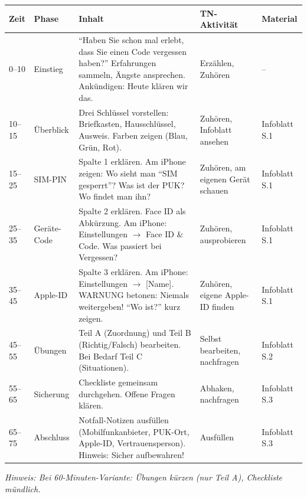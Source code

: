 \documentclass[11pt,a4paper]{article}
\begin{document}
\begin{longtable}{|p{1cm}|p{1.8cm}|p{4.5cm}|p{3.5cm}|p{2cm}|}
\hline
\textbf{Zeit} & \textbf{Phase} & \textbf{Inhalt} & \textbf{TN-Aktivität} & \textbf{Material} \\
\hline
\endhead

0--10 & Einstieg & ``Haben Sie schon mal erlebt, dass Sie einen Code vergessen haben?'' Erfahrungen sammeln, Ängste ansprechen. Ankündigen: Heute klären wir das. & Erzählen, Zuhören & -- \\
\hline

10--15 & Überblick & Drei Schlüssel vorstellen: Briefkasten, Hausschlüssel, Ausweis. Farben zeigen (Blau, Grün, Rot). & Zuhören, Infoblatt ansehen & Infoblatt S.1 \\
\hline

15--25 & SIM-PIN & Spalte 1 erklären. Am iPhone zeigen: Wo sieht man ``SIM gesperrt''? Was ist der PUK? Wo findet man ihn? & Zuhören, am eigenen Gerät schauen & Infoblatt S.1 \\
\hline

25--35 & Geräte-Code & Spalte 2 erklären. Face ID als Abkürzung. Am iPhone: Einstellungen $\rightarrow$ Face ID \& Code. Was passiert bei Vergessen? & Zuhören, ausprobieren & Infoblatt S.1 \\
\hline

35--45 & Apple-ID & Spalte 3 erklären. Am iPhone: Einstellungen $\rightarrow$ [Name]. WARNUNG betonen: Niemals weitergeben! ``Wo ist?'' kurz zeigen. & Zuhören, eigene Apple-ID finden & Infoblatt S.1 \\
\hline

45--55 & Übungen & Teil A (Zuordnung) und Teil B (Richtig/Falsch) bearbeiten. Bei Bedarf Teil C (Situationen). & Selbst bearbeiten, nachfragen & Infoblatt S.2 \\
\hline

55--65 & Sicherung & Checkliste gemeinsam durchgehen. Offene Fragen klären. & Abhaken, nachfragen & Infoblatt S.3 \\
\hline

65--75 & Abschluss & Notfall-Notizen ausfüllen (Mobilfunkanbieter, PUK-Ort, Apple-ID, Vertrauensperson). Hinweis: Sicher aufbewahren! & Ausfüllen & Infoblatt S.3 \\
\hline
\end{longtable}

\textit{Hinweis: Bei 60-Minuten-Variante: Übungen kürzen (nur Teil A), Checkliste mündlich.}

\end{document}
